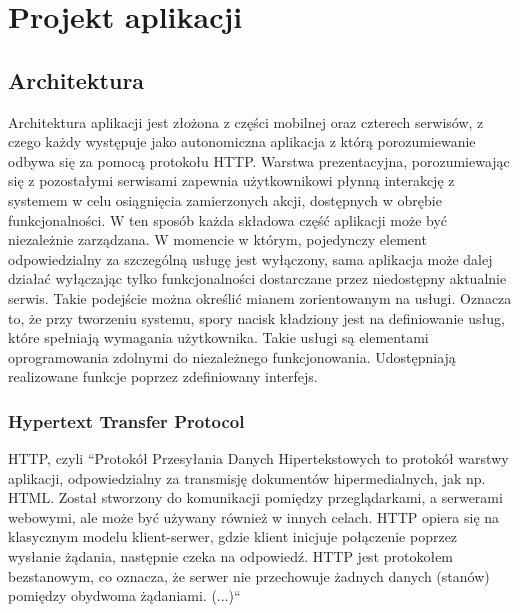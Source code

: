 \chapter{Projekt aplikacji}

\section{Architektura}

Architektura aplikacji jest złożona z części mobilnej oraz czterech serwisów, z czego każdy występuje jako autonomiczna aplikacja z którą porozumiewanie odbywa się za pomocą protokołu HTTP. Warstwa prezentacyjna, porozumiewając się z pozostałymi serwisami zapewnia użytkownikowi płynną interakcję z systemem w celu osiągnięcia zamierzonych akcji, dostępnych w obrębie funkcjonalności. W ten sposób każda składowa część aplikacji może być niezależnie zarządzana. W momencie w którym, pojedynczy element odpowiedzialny za szczególną usługę jest wyłączony, sama aplikacja może dalej działać wyłączając tylko funkcjonalności dostarczane przez niedostępny aktualnie serwis.
\linebreak
Takie podejście można określić mianem zorientowanym na usługi. Oznacza to, że przy tworzeniu systemu, spory nacisk kładziony jest na definiowanie usług, które spełniają wymagania użytkownika. Takie usługi są elementami oprogramowania zdolnymi do niezależnego funkcjonowania. Udostępniają realizowane funkcje poprzez zdefiniowany interfejs.

\subsection{Hypertext Transfer Protocol}
HTTP, czyli ``Protokół Przesyłania Danych Hipertekstowych to protokół warstwy aplikacji, odpowiedzialny za transmisję dokumentów hipermedialnych, jak np. HTML. Został stworzony do komunikacji pomiędzy przeglądarkami, a serwerami webowymi, ale może być używany również w innych celach. HTTP opiera się na klasycznym modelu klient-serwer, gdzie klient inicjuje połączenie poprzez wysłanie żądania, następnie czeka na odpowiedź. HTTP jest protokołem bezstanowym, co oznacza, że serwer nie przechowuje żadnych danych (stanów) pomiędzy obydwoma żądaniami. (...)``~~\cite{http}
\linebreak

